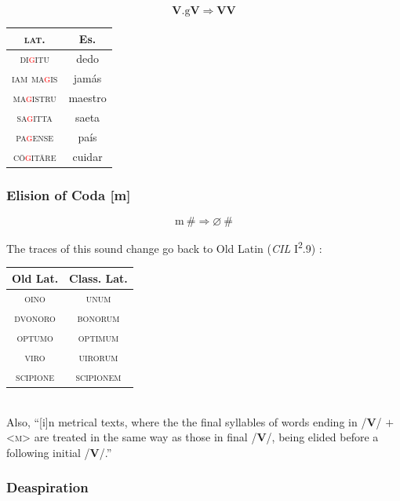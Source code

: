 \documentclass{report}[12pt]
\begin{document}
\begin{tcolorbox}
  \[ \textbf{V}.\text{g}\textbf{V} \Rightarrow \textbf{V}\textbf{V} \]
\end{tcolorbox}

\begin{tabular}{c c}
  \textsc{lat.} & Es. \\
  \hline
  \textsc{di\textcolor{red}{g}itu} & dedo \\
  \textsc{iam ma\textcolor{red}{g}is} & jamás \\
  \textsc{ma\textcolor{red}{g}istru} & maestro \\
  \textsc{sa\textcolor{red}{g}itta} & saeta \\
  \textsc{pa\textcolor{red}{g}ense} & país \\
  \textsc{c\={o}\textcolor{red}{g}it\={a}re} & cuidar \\
\end{tabular}

\subsubsection{Elision of Coda [m]}

\begin{tcolorbox}
  \[ \text{m}\ \# \Rightarrow \varnothing\ \# \]
\end{tcolorbox}

The traces of this sound change go back to Old Latin (\emph{CIL} I\textsuperscript{2}.9) \parencite[p.~17]{companion_to_latin}: \\
\begin{tabular}{c c}
  Old Lat. & Class. Lat. \\
  \hline
  \textsc{oino} & \textsc{unum} \\
  \textsc{dvonoro} & \textsc{bonorum} \\
  \textsc{optumo} & \textsc{optimum} \\
  \textsc{viro} & \textsc{uirorum} \\
  \textsc{scipione} & \textsc{scipionem} \\
\end{tabular} \\
Also, ``[i]n metrical texts, where the the final syllables of words ending in /\textbf{V}/ $+$ <\textsc{m}> are treated in the same way as those in final /\textbf{V}/, being elided before a following initial /\textbf{V}/.'' \parencite[p.~87]{companion_to_latin}

\subsubsection{Deaspiration}
\end{document}
